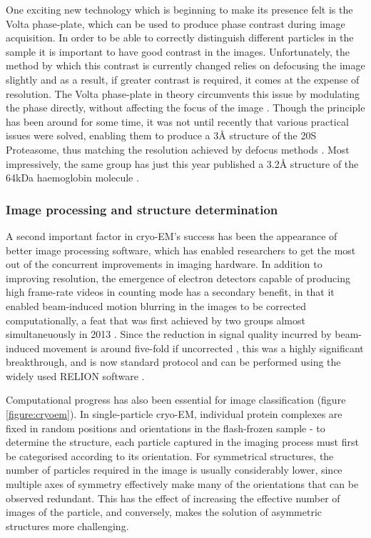 \documentclass[a4paper,11pt,twoside,openright]{scrbook}
\begin{document}
One exciting new technology which is beginning to make its presence felt is the Volta phase-plate, which can be used to produce phase contrast during image acquisition. In order to be able to correctly distinguish different particles in the sample it is important to have good contrast in the images. Unfortunately, the method by which this contrast is currently changed relies on defocusing the image slightly and as a result, if greater contrast is required, it comes at the expense of resolution. The Volta phase-plate in theory circumvents this issue by modulating the phase directly, without affecting the focus of the image \cite{Danev2014}. Though the principle has been around for some time, it was not until recently that various practical issues were solved, enabling them to produce a 3Å structure of the 20S Proteasome, thus matching the resolution achieved by defocus methods \cite{Danev2016}. Most impressively, the same group has just this year published a 3.2Å structure of the 64kDa haemoglobin molecule \cite{Khoshouei2017}.

\subsubsection{Image processing and structure determination}
A second important factor in cryo-EM's success has been the appearance of better image processing software, which has enabled researchers to get the most out of the concurrent improvements in imaging hardware. In addition to improving resolution, the emergence of electron detectors capable of producing high frame-rate videos in counting mode has a secondary benefit, in that it enabled beam-induced motion blurring in the images to be corrected computationally, a feat that was first achieved by two groups almost simultaneuously in 2013 \cite{Bai2013, Li2013}. Since the reduction in signal quality incurred by beam-induced movement is around five-fold if uncorrected \cite{Henderson1985}, this was a highly significant breakthrough, and is now standard protocol and can be performed using the widely used RELION software \cite{Scheres2012,Scheres2014}.


Computational progress has also been essential for image classification (figure \ref{figure:cryoem}). In single-particle cryo-EM, individual protein complexes are fixed in random positions and orientations in the flash-frozen sample - to determine the structure, each particle captured in the imaging process must first be categorised according to its orientation. For symmetrical structures, the number of particles required in the image is usually considerably lower, since multiple axes of symmetry effectively make many of the orientations that can be observed redundant. This has the effect of increasing the effective number of images of the particle, and conversely, makes the solution of asymmetric structures more challenging.
\end{document}

